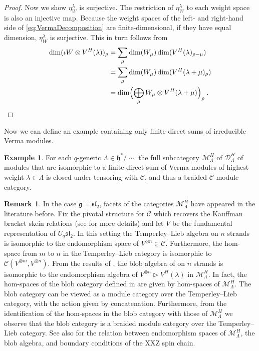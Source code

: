 \documentclass[12pt,dvipsnames]{article}
\numberwithin{equation}{section}
\theoremstyle{definition}
\newtheorem{remark}[definition]{Remark}
\newtheorem{example}[definition]{Example}
\newcommand{\cat}[1]{\mathcal{#1}}
\newcommand{\1}{\ensuremath{\mathbbm{1}}}
\begin{document}
\begin{proof}
    Now we show $\eta_W^\lambda$ is surjective. The restriction of $\eta_W^\lambda$ to each weight space is also an injective map. Because the weight spaces of the left- and right-hand side of \eqref{eq:VermaDecomposition} are finite-dimensional, if they have equal dimension, $\eta_W^\lambda$ is surjective. 
    This in turn follows from
    \begin{align}
        \dim(\iota W\otimes V^H(\lambda))_\rho &= \sum_\mu\dim(W_\mu)\dim(V^H(\lambda)_{\rho-\mu})
        \nonumber\\
        &= \sum_\mu \dim(W_\mu)\dim(V^H(\lambda+\mu)_\rho) \nonumber\\
        &= \dim\Bigl(\bigoplus_\mu W_\mu\otimes V^H(\lambda+\mu)\Bigr)_\rho \;.
    \end{align}
\end{proof}

Now we can define an example containing only finite direct sums of irreducible Verma modules.
\begin{example}\label{ex:Verma}
    For each $q$-generic $\Lambda\in\mathfrak{h}^\ast/\sim$ the full subcategory $\cat{M}^H_\Lambda$ of $\cat{D}^H_\Lambda$ of modules that are isomorphic to a finite direct sum of Verma modules of highest weight $\lambda\in\Lambda$ is closed under tensoring with $\cat{C}$, and thus a braided $\cat{C}$-module category. 
\end{example}

\begin{remark}
In the case $\mathfrak{g} = \mathfrak{sl}_2$, facets of the categories $\cat{M}^H_\Lambda$ have appeared in the literature before. Fix the pivotal structure for $\cat{C}$ which recovers the Kauffman bracket skein relations (see \cite{Ti10} for more details) and let $V$ be the fundamental representation of $U_q\mathfrak{sl}_2$. In this setting the Temperley--Lieb algebra on $n$ strands is isomorphic to the endomorphism space of $V^{\otimes n}\in\cat{C}$. Furthermore, the hom-space from $m$ to $n$ in the Temperley--Lieb category is isomorphic to $\cat{C}(V^{\otimes m},V^{\otimes n})$. From the results of \cite{ILZ18}, the blob algebra of \cite{MS93} on $n$ strands is isomorphic to the endomorphism algebra of $V^{\otimes n}\triangleright V^H(\lambda)$ in $\cat{M}^H_\Lambda$. In fact, the hom-spaces of the blob category defined in \cite[Sec.\,2.2]{LNV20} are given by hom-spaces of $\cat{M}^H_\Lambda$. The blob category can be viewed as a module category over the Temperley--Lieb category, with the action given by concatenation. Furthermore, from the identification of the hom-spaces in the blob category with those of $\cat{M}_\Lambda^H$ we observe that the blob category is a braided module category over the Temperley--Lieb category. See also \cite{CGS22} for the relation between endomorphism spaces of $\cat{M}^H_\Lambda$, the blob algebra, and boundary conditions of the XXZ spin chain.
\end{remark}
\end{document}
